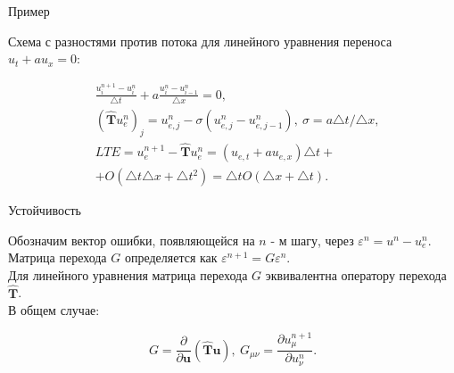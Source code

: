 \documentclass[12pt,xcolor=pst,aspectratio=169]{beamer}
\begin{document}
\begin{frame}{Пример}

	\transdissolve[duration=0.1]
	\justifying
	\large

	Схема с разностями против потока для линейного уравнения переноса $u_{t} + a u_{x} = 0$:

	\[
		\begin{split}
			&\frac{u^{n + 1}_{i} - u^{n}_{i}}{\triangle t} + a \frac{u^{n}_{i} - u^{n}_{i - 1}}{\triangle x} = 0, \\
			&\left( \hat{\textbf{T}} u^{n}_{e} \right)_{j} = u^{n}_{e, j} - \sigma \left( u^{n}_{e, j} - u^{n}_{e, j - 1} \right), \: \sigma = a \triangle t / \triangle x, \\
			&LTE = u^{n + 1}_{e} - \hat{\textbf{T}} u^{n}_{e} = \left( u_{e, t} + a u_{e, x} \right) \triangle t +\\
			& + O \left( \triangle t \triangle x + \triangle t^{2} \right) = \triangle t O \left( \triangle x + \triangle t \right).
		\end{split}
	\]

\end{frame}

\begin{frame}{Устойчивость}

	\transdissolve[duration=0.1]
	\justifying
	\large

	Обозначим вектор ошибки, появляющейся на $n$ - м шагу, через $\varepsilon^{n} = u^{n} - u^{n}_{e}$.\\

	Матрица перехода $G$ определяется как $\varepsilon^{n + 1} = G \varepsilon^{n}$.\\

	Для линейного уравнения матрица перехода $G$ эквивалентна оператору перехода $\hat{\textbf{T}}$.\\

	В общем случае:

	\[
		G = \frac{\partial}{\partial \textbf{u}} \left( \hat{\textbf{T}} \textbf{u} \right), \: G_{\mu \nu} = \frac{\partial u^{n + 1}_{\mu}}{\partial u^{n}_{\nu}}.
	\]

\end{frame}
\end{document}
